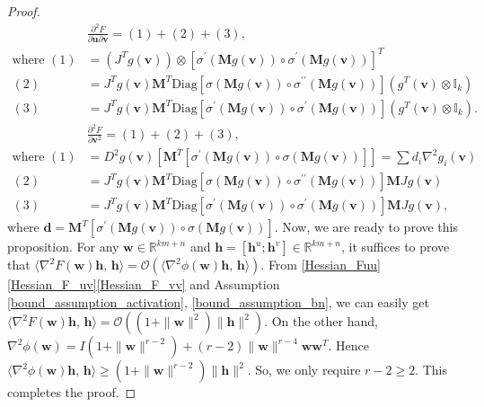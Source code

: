 \documentclass[twoside,11pt]{article}
\newcommand{\be}{\begin{equation}}
\newcommand{\ee}{\end{equation}}
\newcommand{\R}{\mathbb R}
\def\inprod#1#2{\langle#1,\,#2\rangle}
\def\vd{{\bm{d}}}
\def\vh{{\bm{h}}}
\def\vu{{\bm{u}}}
\def\vv{{\bm{v}}}
\def\vw{{\bm{w}}}
\def\mM{{\bm{M}}}
\begin{document}
\begin{proof}
\be 
\begin{aligned}
&\frac{\partial^2F}{\partial\vu\partial\vv}=(1)+(2)+(3),\\
\text{where }(1)&=\left(J^Tg(\vv)\right)\otimes\left[\sigma^\prime(\mM g(\vv))\circ\sigma^{\prime}(\mM g(\vv))\right]^T\\
(2)&=J^Tg(\vv)\mM^T\text{Diag}[\sigma(\mM g(\vv))\circ\sigma^{\prime\prime}(\mM g(\vv))]\left(g^T(\vv)\otimes\mathbb I_k\right)\\
(3)&=J^Tg(\vv)\mM^T\text{Diag}[\sigma^\prime(\mM g(\vv))\circ\sigma^{\prime}(\mM g(\vv))]\left(g^T(\vv)\otimes\mathbb I_k\right).
\end{aligned}
\label{Hessian_F_uv}
\ee 
\be 
\begin{aligned}
&\frac{\partial^2F}{\partial\vv^2}=(1)+(2)+(3),\\
\text{where }(1)&=D^2g(\vv)\left[\mM^T[\sigma^\prime(\mM g(\vv))\circ\sigma(\mM g(\vv))]\right]=\sum d_i\nabla^2g_i(\vv)\\
(2)&=J^Tg(\vv)\mM^T\text{Diag}[\sigma(\mM g(\vv))\circ\sigma^{\prime\prime}(\mM g(\vv))]\mM Jg(\vv)\\
(3)&=J^Tg(\vv)\mM^T\text{Diag}[\sigma^\prime(\mM g(\vv))\circ\sigma^{\prime}(\mM g(\vv))]\mM Jg(\vv),
\end{aligned}
\label{Hessian_F_vv}
\ee 
where $\vd=\mM^T[\sigma^\prime(\mM g(\vv))\circ\sigma(\mM g(\vv))]$. Now, we are ready to prove this proposition. For any $\vw\in\R^{km+n}$ and $\vh=[\vh^u;\vh^v]\in\R^{km+n}$, it suffices to prove that $\inprod{\nabla^2F(\vw)\vh}{\vh}=\mathcal O(\inprod{\nabla^2\phi(\vw)\vh}{\vh})$. From \eqref{Hessian_Fuu}\eqref{Hessian_F_uv}\eqref{Hessian_F_vv} and Assumption \ref{bound_assumption_activation}, \ref{bound_assumption_bn}, we can easily get $\inprod{\nabla^2F(\vw)\vh}{\vh}=\mathcal O((1+\|\vw\|^2)\|\vh\|^2)$. On the other hand, $\nabla^2\phi(\vw)=I(1+\|\vw\|^{r-2})+(r-2)\|\vw\|^{r-4}\vw\vw^T$. Hence $\inprod{\nabla^2\phi(\vw)\vh}{\vh}\geq(1+\|\vw\|^{r-2})\|\vh\|^2$. So, we only require $r-2\geq2$. This completes the proof.   
\end{proof}
\end{document}
